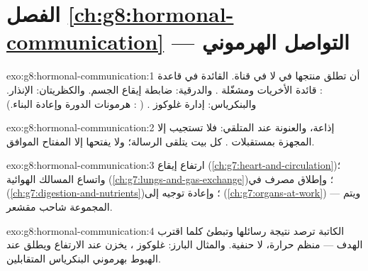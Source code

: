\section*{الفصل \ref{ch:g8:hormonal-communication} --- التواصل الهرموني}

\begin{solution}{exo:g8:hormonal-communication:1}
أن تطلق منتجها في  لا في قناة.  القائدة في
قاعدة : قائدة الأخريات ومشغّلة . والدرقية:
ضابطة إيقاع الجسم. والكظريتان:  الإنذار.
والبنكرياس: إدارة غلوكوز . ( :
هرمونات الدورة وإعادة البناء.)
\end{solution}

\begin{solution}{exo:g8:hormonal-communication:2}
 إذاعة، والعنونة عند المتلقي: فلا تستجيب إلا
 المجهزة بمستقبلات . كل بيت يتلقى الرسالة؛
ولا يفتحها إلا المفتاح الموافق.
\end{solution}

\begin{solution}{exo:g8:hormonal-communication:3}
ارتفاع إيقاع  (\cref{ch:g7:heart-and-circulation})؛
واتساع المسالك الهوائية
(\cref{ch:g7:lungs-and-gas-exchange})؛ وإطلاق مصرف
 في 
(\cref{ch:g7:digestion-and-nutrients})؛ وإعادة توجيه
 إلى  (\cref{ch:g7:organs-at-work}) --- ويتم
المجموعة  شاحب مقشعر.
\end{solution}

\begin{solution}{exo:g8:hormonal-communication:4}
 الكاتبة ترصد نتيجة رسائلها وتبطئ كلما اقترب الهدف
--- منظم حرارة، لا حنفية. والمثال البارز: غلوكوز ،
يخزن عند الارتفاع ويطلق عند الهبوط بهرموني البنكرياس
المتقابلين.
\end{solution}

